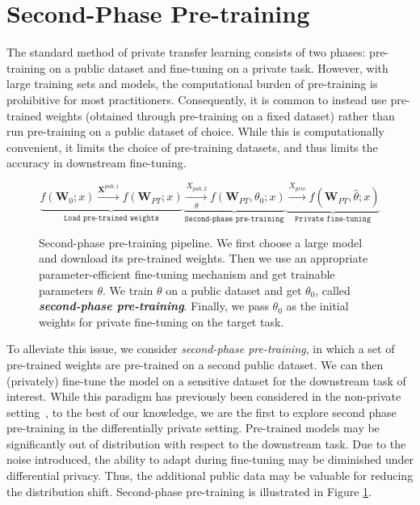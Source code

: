 \documentclass[11pt]{article}
\begin{document}

\section{Second-Phase Pre-training}

The standard method of private transfer learning consists of two phases: pre-training on a public dataset and fine-tuning on a private task.
However, with large training sets and models, the computational burden of pre-training is prohibitive for most practitioners. 
Consequently, it is common to instead use pre-trained weights (obtained through pre-training on a fixed dataset) rather than run pre-training on a public dataset of choice. While this is computationally convenient, it limits the choice of pre-training datasets, and thus limits the accuracy in downstream fine-tuning.

\begin{figure*}[!h]
    \begin{equation*}
    \underbrace{f(\mathbf{W}_0; x) \xrightarrow[]{\mathbf{X}^{pub, 1}} f(\mathbf{W}_{PT}; x)}_{\texttt{Load pre-trained weights}} \underbrace{\xrightarrow[\theta]{X_{pub, 2}} f(\mathbf{W}_{PT}, \theta_0; x)}_{\texttt{Second-phase pre-training}} \underbrace{\xrightarrow[]{X_{priv}} f(\mathbf{W}_{PT}, \hat{\theta}; x)}_{\texttt{Private fine-tuning}}
\end{equation*}
\caption{Second-phase pre-training pipeline. We first choose a large model and download its pre-trained weights. Then we use an appropriate parameter-efficient fine-tuning mechanism and get trainable parameters $\theta$. We train $\theta$ on a public dataset and get $\theta_0$, called \textbf{\textit{second-phase pre-training}}. Finally, we pass $\theta_0$ as the initial weights for private fine-tuning on the target task.}
\label{second-phase}
\end{figure*}

To alleviate this issue, we consider \emph{second-phase pre-training}, in which a set of pre-trained weights are pre-trained on a second public dataset.
We can then (privately) fine-tune the model on a sensitive dataset for the downstream task of interest.
While this paradigm has previously been considered in the non-private setting~\cite{dontstop}, to the best of our knowledge, we are the first to explore second phase pre-training in the differentially private setting. 
Pre-trained models may be significantly out of distribution with respect to the downstream task.
Due to the noise introduced, the ability to adapt during fine-tuning may be diminished under differential privacy. 
Thus, the additional public data may be valuable for reducing the distribution shift. 
Second-phase pre-training is illustrated in Figure \ref{second-phase}. 
\end{document}
